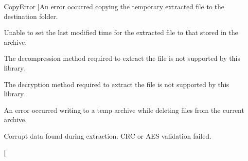 \begin{Desc}
\begin{description}
{Copy\+Error\hypertarget{class_ab_zip_ac669c2fce0fbde75677d12711c11c504af1834b62bfacbc694454951991db07d8}{}\label{class_ab_zip_ac669c2fce0fbde75677d12711c11c504af1834b62bfacbc694454951991db07d8}
}]An error occurred copying the temporary extracted file to the destination folder. \item[{\em 
Set\+Mod\+Time\+Failed\hypertarget{class_ab_zip_ac669c2fce0fbde75677d12711c11c504a193afd741eb566f39b60449b5382cbd1}{}\label{class_ab_zip_ac669c2fce0fbde75677d12711c11c504a193afd741eb566f39b60449b5382cbd1}
}]Unable to set the last modified time for the extracted file to that stored in the archive. \item[{\em 
Invalid\+Compressor\hypertarget{class_ab_zip_ac669c2fce0fbde75677d12711c11c504aef61d198809fa602715c8417ce4b7eb8}{}\label{class_ab_zip_ac669c2fce0fbde75677d12711c11c504aef61d198809fa602715c8417ce4b7eb8}
}]The decompression method required to extract the file is not supported by this library. \item[{\em 
Invalid\+Encryption\hypertarget{class_ab_zip_ac669c2fce0fbde75677d12711c11c504a34988dd81ed571efcab3f7143a94b485}{}\label{class_ab_zip_ac669c2fce0fbde75677d12711c11c504a34988dd81ed571efcab3f7143a94b485}
}]The decryption method required to extract the file is not supported by this library. \item[{\em 
Delete\+Error\hypertarget{class_ab_zip_ac669c2fce0fbde75677d12711c11c504a25b7ccd2a6530e4804fb7d687b53d238}{}\label{class_ab_zip_ac669c2fce0fbde75677d12711c11c504a25b7ccd2a6530e4804fb7d687b53d238}
}]An error occurred writing to a temp archive while deleting files from the current archive. \item[{\em 
Corrupted\hypertarget{class_ab_zip_ac669c2fce0fbde75677d12711c11c504ae6325b0e0af02c01b4202af2741dec89}{}\label{class_ab_zip_ac669c2fce0fbde75677d12711c11c504ae6325b0e0af02c01b4202af2741dec89}
}]Corrupt data found during extraction. C\+RC or A\+ES validation failed. \item[{\em 
}
\end{description}
\end{Desc}
